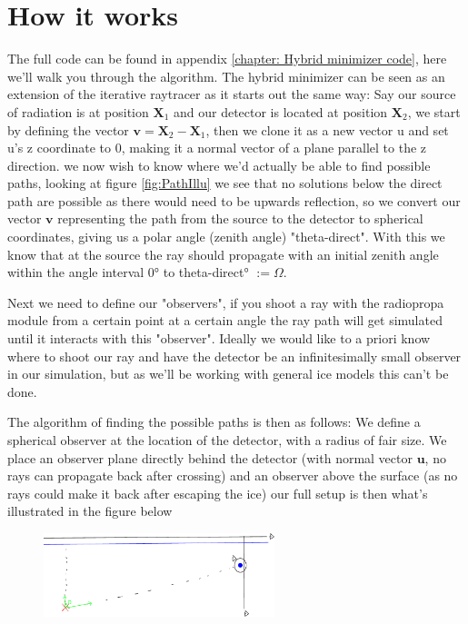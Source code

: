 \documentclass[11pt,a4paper,faculty=we,language=en,doctype=report]{cls/ugent-doc}
\begin{document}
\section{How it works}
The full code can be found in appendix \ref{chapter: Hybrid minimizer code},
here we'll walk you through the algorithm.  The hybrid minimizer can be seen as
an extension of the iterative raytracer \cite{2022icrc.confE1027O} as it starts
out the same way: Say our source of radiation is at position $\mathbf{X}_1$ and
our detector is located at position $\mathbf{X}_2$, we start by defining the
vector $\mathbf{v} = \mathbf{X}_2 - \mathbf{X}_1$, then we clone it as a new
vector u and set u's z coordinate to 0, making it a normal vector of a plane
parallel to the z direction. we now wish to know where we'd actually be able to
find possible paths, looking at figure \ref{fig:PathIllu} we see that
no solutions below the direct path are possible as there would need to be
upwards reflection, so we convert our vector $\mathbf{v}$ representing the path
from the source to the detector to spherical coordinates, giving us a polar
angle (zenith angle) "theta-direct". With this we know that at the source
the ray should propagate with an initial zenith angle within the angle interval
0° to theta-direct° $:= \Omega$.

Next we need to define our "observers", if you shoot a ray with the radiopropa module from a certain
point at a certain angle the ray path will get simulated until it interacts with this "observer".
Ideally we would like to a priori know where to shoot our ray and have the detector be an infinitesimally small
observer in our simulation, but as we'll be working with general ice models this can't be done.

The algorithm of finding the possible paths is then as follows:
We define a spherical observer at the location of the detector, with a radius of fair size. We place an 
observer plane directly behind the detector (with normal vector $\mathbf{u}$, no rays can propagate back after crossing) 
and an observer above the surface (as no rays could make it back after escaping the ice) our 
full setup is then what's illustrated in the figure below
\begin{figure}[h!]
  \centering
  \includegraphics[width=0.6\textwidth]{algoillu.pdf}
\end{figure}\\
\end{document}
